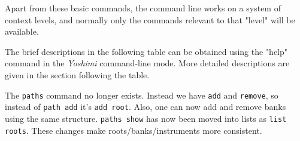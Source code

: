    Apart from these basic commands, the command line works on a system of
   context levels, and normally only the commands relevant to that "level" will
   be available.

   The brief descriptions in the following table can be obtained
   using the "help" command in the \textsl{Yoshimi} command-line mode.
   More detailed descriptions are given in the section following the table.

   The \texttt{paths} command no longer exists. Instead we have \texttt{add}
   and \texttt{remove}, so instead of \texttt{path add} it's \texttt{add root}.
   Also, one can now add and remove banks using the same structure.
   \texttt{paths show} has now been moved into lists as \texttt{list roots}.
   These changes make roots/banks/instruments more consistent.

